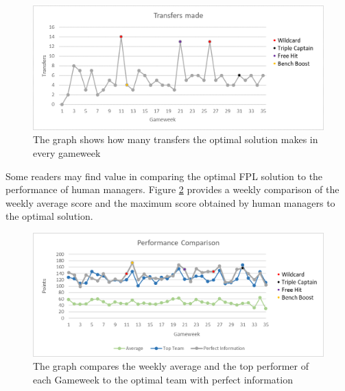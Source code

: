 \begin{figure}[H]
\label{fig_Transfers}
    \centering
    \includegraphics[scale=0.75]{fig/chapter_7/Transfers_colour.png}
    \caption{The graph shows how many transfers the optimal solution makes in every gameweek}
\label{Figure_Transfers}    
\end{figure}

Some readers may find value in comparing the optimal FPL solution to the performance of human managers. Figure \ref{Figure_Comparison} provides a weekly comparison of the weekly average score and the maximum score obtained by human managers to the optimal solution.

\begin{figure}[H]
\label{fig:Comparison}
    \centering
    \includegraphics[scale=0.75]{fig/chapter_7/Comparison_colour.png}
    \caption{The graph compares the weekly average and the top performer of each Gameweek to the optimal team with perfect information}
\label{Figure_Comparison}    
\end{figure}

